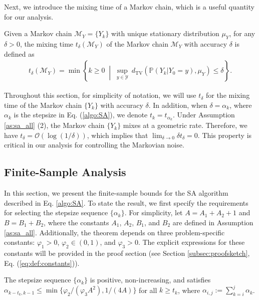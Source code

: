 \documentclass[11 pt]{article}
\begin{document}
	
	Next, we introduce the mixing time of a Markov chain, which is a useful quantity for our analysis.
	\begin{definition}\label{definition:Markov chain mixing time}
		Given a Markov chain $\mathcal{M}_Y=\{Y_k\}$ with unique stationary distribution $\mu_Y$, for any $\delta>0$, the mixing time $t_\delta(\mathcal{M}_Y)$ of the Markov chain $\mathcal{M}_Y$ with accuracy $\delta$ is defined as
		\begin{align}\label{eq:mixing time definition}
			t_\delta(\mathcal{M}_Y) = \min\left\{k \geq 0 \;\middle|\; \sup_{y\in\mathcal{Y}}~ d_{\text{TV}}\left(\mathbb{P}\left(Y_k | Y_0=y\right), \mu_Y\right) \leq \delta \right\}.
		\end{align}
	\end{definition}
	
	Throughout this section, for simplicity of notation, we will use $t_\delta$ for the mixing time of the Markov chain $\{Y_k\}$ with accuracy $\delta$. In addition, when $\delta=\alpha_k$, where $\alpha_k$ is the stepsize in Eq. (\ref{algo:SA}), we denote $t_{k}=t_{\alpha_k}$. Under Assumption \ref{as:sa_all} (2), the Markov chain $\{Y_k\}$ mixes at a geometric rate. Therefore, we have $t_\delta
	=\mathcal{O}( \log \left(1/\delta \right))$,
	which implies that $\lim_{\delta \rightarrow 0} \delta t_\delta = 0$. This property is critical in our analysis for controlling the Markovian noise. 
	
	
	
	\subsection{Finite-Sample Analysis}
	In this section, we present the finite-sample bounds for the SA algorithm described in Eq. \eqref{algo:SA}. To state the result, we first specify the requirements for selecting the stepsize sequence $\{\alpha_k\}$. For simplicity, let $ A = A_1 + A_2 + 1 $ and $ B = B_1 + B_2 $, where the constants $ A_1 $, $ A_2 $, $ B_1 $, and $ B_2 $ are defined in Assumption \ref{as:sa_all}. Additionally, the theorem depends on three problem-specific constants: $ \varphi_1 > 0 $, $ \varphi_2 \in (0, 1) $, and $ \varphi_3 > 0 $. The explicit expressions for these constants will be provided in the proof section (see Section \ref{subsec:proofsketch}, Eq. (\ref{eq:def:constants})).  
	
	\begin{condition}
		\label{condition: stepsizes requirement}
		The stepsize sequence $\{\alpha_k \}$ is positive, non-increasing, and satisfies $\alpha_{k-t_k, k-1} \leq \min\{\varphi_2/\left(\varphi_3 A^2\right), 1/\left(4A\right)\}$ for all $k \geq t_k$, where $\alpha_{i, j}:= \sum^j_{k=i} \alpha_k$.
	\end{condition}
	
\end{document}
